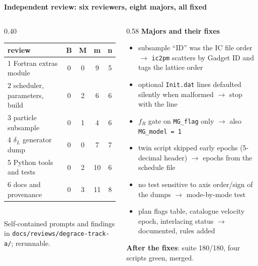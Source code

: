 \documentclass[UTF8]{beamer}
\begin{document}
\begin{frame}{\textbf{Independent review: six reviewers, eight majors, all fixed}}
  \begin{columns}[T]
    \begin{column}{0.40\textwidth}
      \scriptsize
      \begin{tabular}{@{}lcccc@{}}
        \toprule
        review & B & M & m & n \\
        \midrule
        1 Fortran extras module & 0 & 0 & 9 & 5 \\
        2 scheduler, parameters, build & 0 & 2 & 6 & 6 \\
        3 particle subsample & 0 & 1 & 4 & 6 \\
        4 $\delta_L$ generator dump & 0 & 0 & 7 & 7 \\
        5 Python tools and tests & 0 & 2 & 10 & 6 \\
        6 docs and provenance & 0 & 3 & 11 & 8 \\
        \bottomrule
      \end{tabular}
      \\[1ex]
      \scriptsize Self-contained prompts and findings in \texttt{docs/reviews/degrace-track-a/}; rerunnable.
    \end{column}
    \begin{column}{0.58\textwidth}
      \footnotesize
      \textbf{Majors and their fixes}
      \begin{itemize}
        \item subsample ``ID'' was the IC file order $\to$ \texttt{ic2pm} scatters by Gadget ID and tags the lattice order
        \item optional \texttt{Init.dat} lines defaulted silently when malformed $\to$ stop with the line
        \item $f_R$ gate on \texttt{MG\_flag} only $\to$ also \texttt{MG\_model = 1}
        \item twin script skipped early epochs (5-decimal header) $\to$ epochs from the schedule file
        \item no test sensitive to axis order/sign of the dumps $\to$ mode-by-mode test
        \item plan flags table, catalogue velocity epoch, interlacing status $\to$ documented, rules added
      \end{itemize}
      \textbf{After the fixes}: suite 180/180, four scripts green, merged.
    \end{column}
  \end{columns}
\end{frame}
\end{document}

